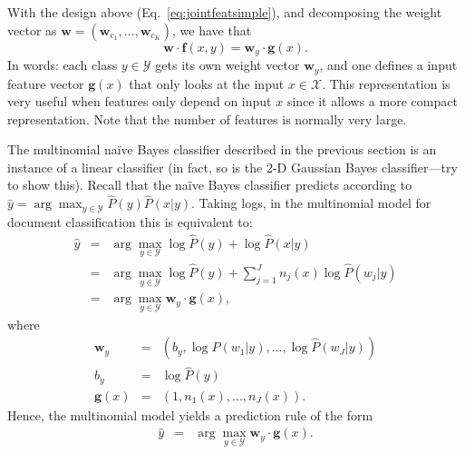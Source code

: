 \begin{remark}
With the design above (Eq.~\ref{eq:jointfeatsimple}), and 
decomposing the weight vector as 
$\boldsymbol{w} = (\boldsymbol{w}_{c_1},\ldots,\boldsymbol{w}_{c_K})$, we 
have that 
\begin{equation}
\boldsymbol{w} \cdot \boldsymbol{f}(x,y) = \boldsymbol{w}_y \cdot \boldsymbol{g}(x).
\end{equation}
In words: each class $y \in \mathcal{Y}$ gets its own weight vector $\boldsymbol{w}_y$, 
and one defines a input feature vector $\boldsymbol{g}(x)$ that only
looks at the input $x \in \mathcal{X}$. This representation is very
useful when features only depend on input $x$ since it allows a more
compact representation. Note that the number of features is normally
very large.
\end{remark}






\begin{remark}
The multinomial na\"ive Bayes classifier described in the previous section is an instance of a linear classifier
(in fact, so is the 2-D Gaussian Bayes classifier---try to show this). 
Recall that the na\"ive Bayes classifier predicts according to ${\hat y} = \arg\max_{y \in \mathcal{Y}} \hat{P}(y) \hat{P}(x|y)$. 
Taking logs, in the multinomial model for document classification this is equivalent to: 
\begin{eqnarray}
{\hat y} &=& \arg\max_{y \in \mathcal{Y}} \log \hat{P}(y) + \log \hat{P}(x|y) \nonumber\\
&=& \arg\max_{y \in \mathcal{Y}} \log \hat{P}(y) + \sum_{j=1}^J n_j(x) \log \hat{P}(w_{j}|y)\nonumber\\
&=& \arg\max_{y \in \mathcal{Y}} \boldsymbol{w}_y \cdot \boldsymbol{g}(x), 
\end{eqnarray}
where
\begin{eqnarray}
\boldsymbol{w}_y &=& \left(b_y, \log \hat{P}(w_1 | y),\ldots, \log \hat{P}(w_J | y)\right) \nonumber\\
b_y &=& \log \hat{P}(y)\nonumber\\
\boldsymbol{g}(x) &=& (1, n_1(x), \ldots, n_J(x)).
\end{eqnarray}
Hence, the multinomial model yields a prediction rule of the form
\begin{eqnarray}
{\hat y} &=& \arg\max_{y \in \mathcal{Y}} \boldsymbol{w}_y \cdot \boldsymbol{g}(x). 
\end{eqnarray}
\end{remark}

